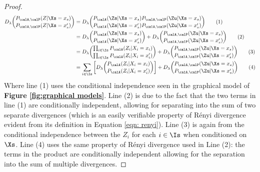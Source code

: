 \begin{proof}
\begin{align}
	D_\lambda \binom{P_{\calA, \calP}(Z | \Xs = x_s)}{P_{\calA, \calP}(Z | \Xs = x_s')} 
	&= D_\lambda \binom{P_{\calA}(\Zs | \Xs = x_s)P_{\calA, \calP}(\Zu | \Xs = x_s)}{P_{\calA}(\Zs | \Xs = x_s')P_{\calA, \calP}(\Zu | \Xs = x_s')} \tag{1} \\
	&=  D_\lambda \binom{P_{\calA}(\Zs | \Xs = x_s)}{P_{\calA}(\Zs | \Xs = x_s')} + D_\lambda \binom{P_{\calA, \calP}(\Zu | \Xs = x_s)}{P_{\calA, \calP}(\Zu | \Xs = x_s')} \tag{2} \\
	&= D_\lambda \binom{\prod_{i \in \Is } P_{\calA}(Z_i | X_i = x_i)}{\prod_{i \in \Is } P_{\calA}(Z_i | X_i = x_i')} + D_\lambda \binom{P_{\calA, \calP}(\Zu | \Xs = x_s)}{P_{\calA, \calP}(\Zu | \Xs = x_s')} \tag{3} \\
	&= \sum_{i \in \Is} \bigg[ D_\lambda \binom{P_\calA(Z_i | X_i = x_i)}{P_\calA(Z_i | X_i = x_i')} \bigg]
	+ D_\lambda \binom{P_{\calA, \calP}(\Zu | \Xs = x_s)}{P_{\calA, \calP}(\Zu | \Xs = x_s')} \tag{4}
\end{align}
Where line (1) uses the conditional independence seen in the graphical model of \textbf{Figure \ref{fig:graphical models}}. Line (2) is due to the fact that the two terms in line (1) are conditionally independent, allowing for separating into the sum of two separate divergences (which is an easily verifiable property of R\'enyi divergence evident from its definition in Equation \ref{eqn: renyi}). Line (3) is again from the conditional independence between the $Z_i$ for each $i \in \Is$ when conditioned on $\Xs$. Line (4) uses the same property of R\'enyi divergence used in Line (2): the terms in the product are conditionally independent allowing for the separation into the sum of multiple divergences. 


\end{proof}
